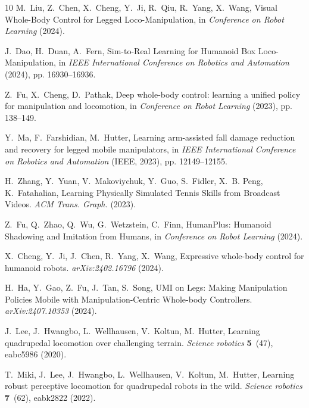 \documentclass[9pt,twocolumn,twoside]{osajnl}
\begin{document}
\begin{thebibliography}{10}
    M.~{Liu}, Z.~{Chen}, X.~{Cheng}, Y.~{Ji}, R.~{Qiu}, R.~{Yang}, X.~{Wang},
      Visual Whole-Body Control for Legged Loco-Manipulation, in \emph{Conference
      on Robot Learning} (2024).
    
    J.~{Dao}, H.~{Duan}, A.~{Fern}, Sim-to-Real Learning for Humanoid Box
      Loco-Manipulation, in \emph{IEEE International Conference on Robotics and
      Automation} (2024), pp. 16930--16936.
    
    Z.~{Fu}, X.~{Cheng}, D.~{Pathak}, Deep whole-body control: learning a unified
      policy for manipulation and locomotion, in \emph{Conference on Robot
      Learning} (2023), pp. 138--149.
    
    Y.~{Ma}, F.~{Farshidian}, M.~{Hutter}, Learning arm-assisted fall damage
      reduction and recovery for legged mobile manipulators, in \emph{IEEE
      International Conference on Robotics and Automation} (IEEE, 2023), pp.
      12149--12155.
    
    H.~{Zhang}, Y.~{Yuan}, V.~{Makoviychuk}, Y.~{Guo}, S.~{Fidler}, X.~B. {Peng},
      K.~{Fatahalian}, Learning Physically Simulated Tennis Skills from Broadcast
      Videos. \emph{ACM Trans. Graph.}  (2023).
    
    Z.~{Fu}, Q.~{Zhao}, Q.~{Wu}, G.~{Wetzstein}, C.~{Finn}, HumanPlus: Humanoid
      Shadowing and Imitation from Humans, in \emph{Conference on Robot Learning}
      (2024).
    
    X.~{Cheng}, Y.~{Ji}, J.~{Chen}, R.~{Yang}, X.~{Wang}, Expressive whole-body
      control for humanoid robots. \emph{arXiv:2402.16796}  (2024).
    
    H.~{Ha}, Y.~{Gao}, Z.~{Fu}, J.~{Tan}, S.~{Song}, UMI on Legs: Making
      Manipulation Policies Mobile with Manipulation-Centric Whole-body
      Controllers. \emph{arXiv:2407.10353}  (2024).
    
    J.~{Lee}, J.~{Hwangbo}, L.~{Wellhausen}, V.~{Koltun}, M.~{Hutter}, Learning
      quadrupedal locomotion over challenging terrain. \emph{Science robotics}
      \textbf{5}~(47), eabc5986 (2020).
    
    T.~{Miki}, J.~{Lee}, J.~{Hwangbo}, L.~{Wellhausen}, V.~{Koltun}, M.~{Hutter},
      Learning robust perceptive locomotion for quadrupedal robots in the wild.
      \emph{Science robotics} \textbf{7}~(62), eabk2822 (2022).
    

\end{thebibliography}
\end{document}
